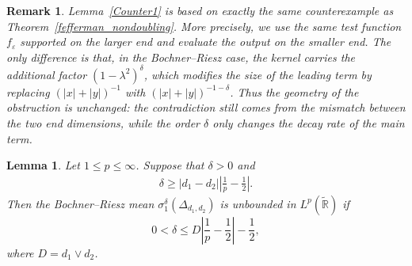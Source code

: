 \documentclass[12pt]{amsart}
\newcommand\R{\mathbb{R}}
\newcommand\Lapd{\Delta_{d_1, d_2}}
\newtheorem{lemma}[theorem]{Lemma}
\newtheorem{remark}[theorem]{Remark}
\begin{document}
\begin{remark}
Lemma~\ref{Counter1} is based on exactly the same counterexample as Theorem~\ref{fefferman_nondoubling}. More precisely, we use the same test function $f_\varepsilon$ supported on the larger end and evaluate the output on the smaller end. The only difference is that, in the Bochner--Riesz case, the kernel carries the additional factor $(1-\lambda^2)^\delta$, which modifies the size of the leading term by replacing $(|x|+|y|)^{-1}$ with $(|x|+|y|)^{-1-\delta}$. Thus the geometry of the obstruction is unchanged: the contradiction still comes from the mismatch between the two end dimensions, while the order $\delta$ only changes the decay rate of the main term.
\end{remark}





\begin{lemma}\label{Counter2}
Let $1\le p\le \infty$. Suppose that $\delta>0$ and
\begin{align}\label{BR2}
\delta \ge |d_1-d_2| \left| \frac{1}{p} - \frac{1}{2} \right|.
\end{align}
Then the Bochner--Riesz mean $\sigma_{1}^\delta(\Lapd)$ is unbounded in $L^p(\widetilde{\R})$ if
\begin{equation}\label{counter2.1}
    0< \delta \le D \left|\frac{1}{p}-\frac{1}{2}\right|-\frac{1}{2},
\end{equation}
where $D=d_1 \vee d_2$.
\end{lemma}
\end{document}
